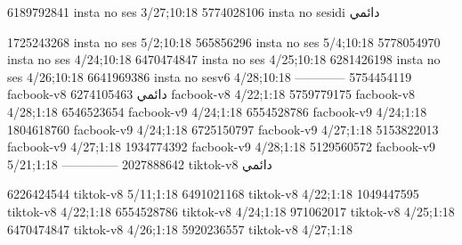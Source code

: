 
6189792841 insta no ses
3/27;10:18
5774028106 insta no sesidi
دائمي


1725243268 insta no ses
5/2;10:18
565856296 insta no ses
5/4;10:18
5778054970 insta no ses
4/24;10:18
6470474847 insta no ses
4/25;10:18
6281426198 insta no ses
4/26;10:18
6641969386 insta no sesv6
4/28;10:18
------------
5754454119 facbook-v8
دائمي
6274105463 facbook-v8
4/22;1:18
5759779175 facbook-v8
4/28;1:18
6546523654 facbook-v9
4/24;1:18
6554528786 facbook-v9
4/24;1:18
1804618760 facbook-v9
4/24;1:18
6725150797 facbook-v9
4/27;1:18
5153822013 facbook-v9
4/27;1:18
1934774392 facbook-v9
4/28;1:18
5129560572 facbook-v9
5/21;1:18
--------------
2027888642 tiktok-v8
دائمي

6226424544 tiktok-v8
5/11;1:18
6491021168 tiktok-v8
4/22;1:18
1049447595 tiktok-v8
4/22;1:18
6554528786 tiktok-v8
4/24;1:18
971062017 tiktok-v8
4/25;1:18
6470474847 tiktok-v8
4/26;1:18
5920236557 tiktok-v8
4/27;1:18
